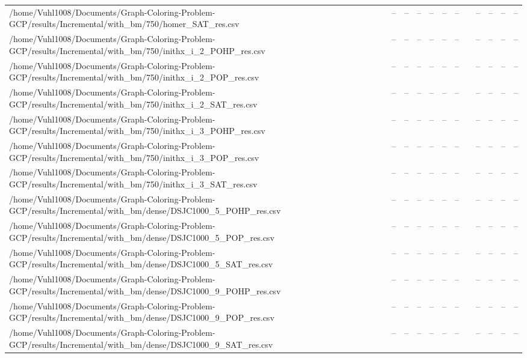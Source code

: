 \begin{table}[htbp]
\begin{tabular}{llllllllllll}
/home/Vuhl1008/Documents/Graph-Coloring-Problem-GCP/results/Incremental/with\_bm/750/homer\_SAT\_res.csv & -- & -- & -- & -- & -- & -- & {} & -- & -- & -- & -- \\
/home/Vuhl1008/Documents/Graph-Coloring-Problem-GCP/results/Incremental/with\_bm/750/inithx\_i\_2\_POHP\_res.csv & -- & -- & -- & -- & -- & -- & {} & -- & -- & -- & -- \\
/home/Vuhl1008/Documents/Graph-Coloring-Problem-GCP/results/Incremental/with\_bm/750/inithx\_i\_2\_POP\_res.csv & -- & -- & -- & -- & -- & -- & {} & -- & -- & -- & -- \\
/home/Vuhl1008/Documents/Graph-Coloring-Problem-GCP/results/Incremental/with\_bm/750/inithx\_i\_2\_SAT\_res.csv & -- & -- & -- & -- & -- & -- & {} & -- & -- & -- & -- \\
/home/Vuhl1008/Documents/Graph-Coloring-Problem-GCP/results/Incremental/with\_bm/750/inithx\_i\_3\_POHP\_res.csv & -- & -- & -- & -- & -- & -- & {} & -- & -- & -- & -- \\
/home/Vuhl1008/Documents/Graph-Coloring-Problem-GCP/results/Incremental/with\_bm/750/inithx\_i\_3\_POP\_res.csv & -- & -- & -- & -- & -- & -- & {} & -- & -- & -- & -- \\
/home/Vuhl1008/Documents/Graph-Coloring-Problem-GCP/results/Incremental/with\_bm/750/inithx\_i\_3\_SAT\_res.csv & -- & -- & -- & -- & -- & -- & {} & -- & -- & -- & -- \\
/home/Vuhl1008/Documents/Graph-Coloring-Problem-GCP/results/Incremental/with\_bm/dense/DSJC1000\_5\_POHP\_res.csv & -- & -- & -- & -- & -- & -- & {} & -- & -- & -- & -- \\
/home/Vuhl1008/Documents/Graph-Coloring-Problem-GCP/results/Incremental/with\_bm/dense/DSJC1000\_5\_POP\_res.csv & -- & -- & -- & -- & -- & -- & {} & -- & -- & -- & -- \\
/home/Vuhl1008/Documents/Graph-Coloring-Problem-GCP/results/Incremental/with\_bm/dense/DSJC1000\_5\_SAT\_res.csv & -- & -- & -- & -- & -- & -- & {} & -- & -- & -- & -- \\
/home/Vuhl1008/Documents/Graph-Coloring-Problem-GCP/results/Incremental/with\_bm/dense/DSJC1000\_9\_POHP\_res.csv & -- & -- & -- & -- & -- & -- & {} & -- & -- & -- & -- \\
/home/Vuhl1008/Documents/Graph-Coloring-Problem-GCP/results/Incremental/with\_bm/dense/DSJC1000\_9\_POP\_res.csv & -- & -- & -- & -- & -- & -- & {} & -- & -- & -- & -- \\
/home/Vuhl1008/Documents/Graph-Coloring-Problem-GCP/results/Incremental/with\_bm/dense/DSJC1000\_9\_SAT\_res.csv & -- & -- & -- & -- & -- & -- & {} & -- & -- & -- & -- \\

\end{tabular}
\end{table}
